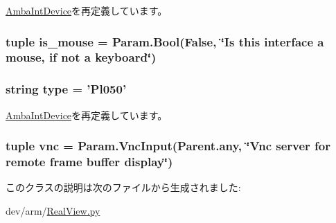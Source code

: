 \hyperlink{classRealView_1_1AmbaIntDevice_a849551e71f91ca939d22d4c083f4c731}{AmbaIntDevice}を再定義しています。\hypertarget{classRealView_1_1Pl050_ac89fcfdcd50917fad036a630d54495c4}{
\subsubsection[{is\_\-mouse}]{\setlength{\rightskip}{0pt plus 5cm}tuple {\bf is\_\-mouse} = Param.Bool(False, \char`\"{}Is this interface a mouse, if not a keyboard\char`\"{})}}
\label{classRealView_1_1Pl050_ac89fcfdcd50917fad036a630d54495c4}
\hypertarget{classRealView_1_1Pl050_acce15679d830831b0bbe8ebc2a60b2ca}{
\subsubsection[{type}]{\setlength{\rightskip}{0pt plus 5cm}string {\bf type} = '{\bf Pl050}'}}
\label{classRealView_1_1Pl050_acce15679d830831b0bbe8ebc2a60b2ca}


\hyperlink{classRealView_1_1AmbaIntDevice_acce15679d830831b0bbe8ebc2a60b2ca}{AmbaIntDevice}を再定義しています。\hypertarget{classRealView_1_1Pl050_afe937f4b2d4f6f3abce13db1d308617d}{
\subsubsection[{vnc}]{\setlength{\rightskip}{0pt plus 5cm}tuple {\bf vnc} = Param.VncInput(Parent.any, \char`\"{}Vnc server for remote frame buffer display\char`\"{})}}
\label{classRealView_1_1Pl050_afe937f4b2d4f6f3abce13db1d308617d}


このクラスの説明は次のファイルから生成されました:\begin{DoxyCompactItemize}
\item 
dev/arm/\hyperlink{RealView_8py}{RealView.py}\end{DoxyCompactItemize}
